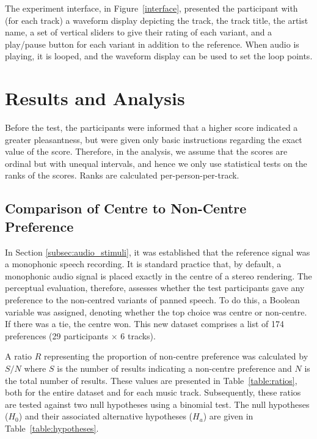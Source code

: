 \documentclass[a4paper,10pt]{edpsci} %
\begin{document}
The experiment interface, in Figure~\ref{interface}, presented the participant with (for each track) a waveform display depicting the track, the track title, the artist name, a set of vertical sliders to give their rating of each variant, and a play/pause button for each variant in addition to the reference. When audio is playing, it is looped, and the waveform display can be used to set the loop points.



\section{Results and Analysis}
\label{sec:ResultsAnalysis}

Before the test, the participants were informed that a higher score indicated a greater pleasantness, but were given only basic instructions regarding the exact value of the score. Therefore, in the analysis, we assume that the scores are ordinal but with unequal intervals, and hence we only use statistical tests on the ranks of the scores. Ranks are calculated per-person-per-track. 

\subsection{Comparison of Centre to Non-Centre Preference}
\label{sec:noncentrepref}

In Section \ref{subsec:audio_stimuli}, it was established that the reference signal was a monophonic speech recording. It is standard practice that, by default, a monophonic audio signal is placed exactly in the centre of a stereo rendering. The perceptual evaluation, therefore, assesses whether the test participants gave any preference to the non-centred variants of panned speech. To do this, a Boolean variable was assigned, denoting whether the top choice was centre or non-centre. If there was a tie, the centre won. This new dataset comprises a list of 174 preferences (29 participants $\times$ 6 tracks).

A ratio $R$ representing the proportion of non-centre preference was calculated by $S/N$ where $S$ is the number of results indicating a non-centre preference and $N$ is the total number of results. These values are presented in Table~\ref{table:ratios}, both for the entire dataset and for each music track. Subsequently, these ratios are tested against two null hypotheses using a binomial test. The null hypotheses ($H_0$) and their associated alternative hypotheses ($H_a$) are given in Table~\ref{table:hypotheses}. 
\end{document}
